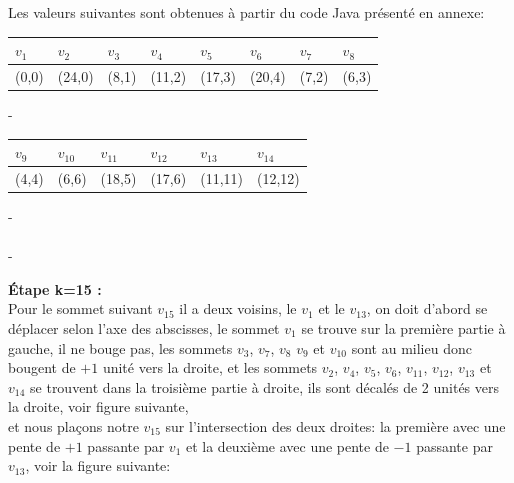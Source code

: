 \documentclass[hidelinks,letterpaper,12pt]{article}
\begin{document}
Les valeurs suivantes sont obtenues à partir du code Java présenté en annexe: \\
\begin{tabularx}{\textwidth}{|*{8}{X|}}
\hline
$v_1$ & $v_2$  & $v_3$ & $v_4$  & $v_5$  & $v_6$  & $v_7$ & $v_8$ \\
\hline 
(0,0) & (24,0) & (8,1) & (11,2) & (17,3) & (20,4) & (7,2) & (6,3) \\
\hline
\end{tabularx}
{\color{white}-}
\\
\begin{tabularx}{\textwidth}{|*{6}{X|}}
\hline
$v_9$ & $v_{10}$ & $v_{11}$ & $v_{12}$ & $v_{13}$ & $v_{14}$ \\
\hline 
(4,4) & (6,6)    & (18,5)   & (17,6)   & (11,11)  & (12,12) \\
\hline
\end{tabularx}
{\color{white}-}
\\ \\
{\color{white}-}


\newpage
\textbf{Étape k=15 :}
\\
Pour le sommet suivant $v_{15}$ il a deux voisins, le $v_1$ et le $v_{13}$,
on doit d'abord se déplacer selon l'axe des abscisses, 
le sommet $v_1$ se trouve sur la première partie à gauche, il ne bouge pas, 	
les sommets $v_3$, $v_7$, $v_8$ $v_9$ et $v_{10}$ sont au milieu donc bougent de $+1$ unité vers la droite,
et les sommets $v_2$, $v_4$, $v_5$, $v_6$, $v_{11}$, $v_{12}$, $v_{13}$ et $v_{14}$ se trouvent dans la troisième partie à droite, ils sont décalés de 2 unités vers la droite, voir figure suivante, \\
et nous plaçons notre $v_{15}$ sur l'intersection des deux droites: la première avec une pente de $+1$ passante par $v_1$ et la deuxième avec une pente de $-1$ passante par $v_{13}$, voir la figure suivante:
\end{document}
